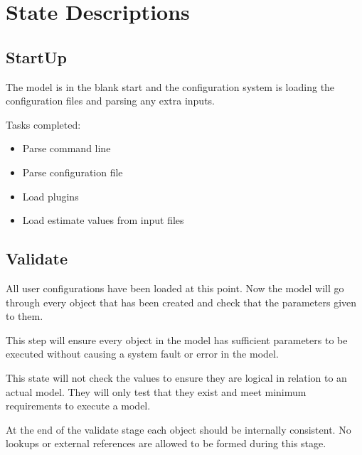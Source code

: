 \documentclass[a4paper,11pt,twoside,pdftex,draft]{article}
\providecommand{\tightlist}{%
  \setlength{\itemsep}{0pt}\setlength{\parskip}{0pt}}
\begin{document}

\hypertarget{state-descriptions}{%
\section[State
Descriptions]{\texorpdfstring{\protect\hypertarget{anchor-17}{}{}State
Descriptions}{State Descriptions}}\label{state-descriptions}}

\hypertarget{startup}{%
\subsection[StartUp]{\texorpdfstring{\protect\hypertarget{anchor-18}{}{}StartUp}{StartUp}}\label{startup}}

The model is in the blank start and the configuration system is loading
the configuration files and parsing any extra inputs.

Tasks completed:

\begin{itemize}
\tightlist
\item
  Parse command line
\item
  Parse configuration file
\item
  Load plugins
\item
  Load estimate values from input files
\end{itemize}

\hypertarget{validate}{%
\subsection[Validate]{\texorpdfstring{\protect\hypertarget{anchor-19}{}{}Validate}{Validate}}\label{validate}}

All user configurations have been loaded at this point. Now the model
will go through every object that has been created and check that the
parameters given to them.

This step will ensure every object in the model has sufficient
parameters to be executed without causing a system fault or error in the
model.

This state will not check the values to ensure they are logical in
relation to an actual model. They will only test that they exist and
meet minimum requirements to execute a model.

At the end of the validate stage each object should be internally
consistent. No lookups or external references are allowed to be formed
during this stage.
\end{document}
